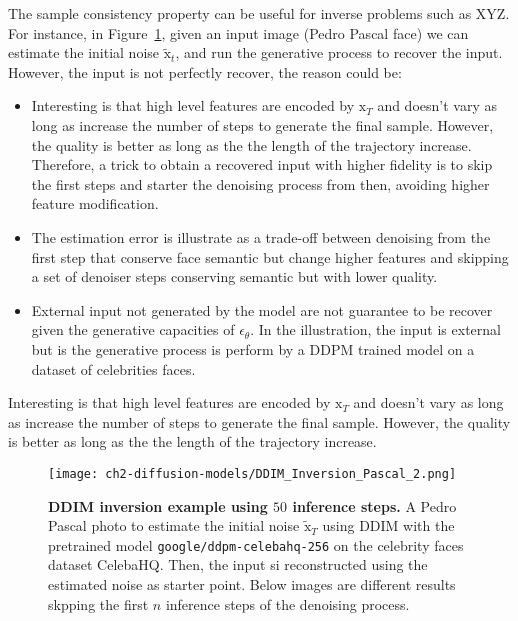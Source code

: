 \noindent The sample consistency property can be useful for inverse problems such as XYZ. For instance, in Figure~\ref{fig:ddim-inversion-pascal}, given an input image (Pedro Pascal face) we can estimate the initial noise $\tilde{\mathrm{x}}_{t}$, and run the generative process to recover the input. However, the input is not perfectly recover, the reason could be:

\begin{itemize}
    \item Interesting is that high level features are encoded by $\mathrm{x}_{T}$ and doesn't vary as long as increase the number of steps to generate the final sample. However, the quality is better as long as the the length of the trajectory increase. Therefore, a trick to obtain a recovered input with higher fidelity is to skip the first steps and starter the denoising process from then, avoiding higher feature modification.
    \item The estimation error is illustrate as a trade-off between denoising from the first step that conserve face semantic but change higher features and skipping a set of denoiser steps conserving semantic but with lower quality.
    \item External input not generated by the model are not guarantee to be recover given the generative capacities of $\epsilon_{\theta}$. In the illustration, the input is external but is the generative process is perform by a DDPM trained model on a dataset of celebrities faces.
\end{itemize}

\noindent Interesting is that high level features are encoded by $\mathrm{x}_{T}$ and doesn't vary as long as increase the number of steps to generate the final sample. However, the quality is better as long as the the length of the trajectory increase. \\

\begin{figure}[ht]
    \centering
    \texttt{[image: ch2-diffusion-models/DDIM\_Inversion\_Pascal\_2.png]}
    \captionsetup{width=\textwidth} %
    \caption{\textbf{DDIM inversion example using $50$ inference steps.} A Pedro Pascal photo to estimate the initial noise $\tilde{\mathrm{x}}_T$ using DDIM with the pretrained model \texttt{google/ddpm-celebahq-256} on the celebrity faces dataset CelebaHQ. Then, the input si reconstructed using the estimated noise as starter point. Below images are different results skpping the first $n$ inference steps of the denoising process.}
    \label{fig:ddim-inversion-pascal}
  \end{figure}

